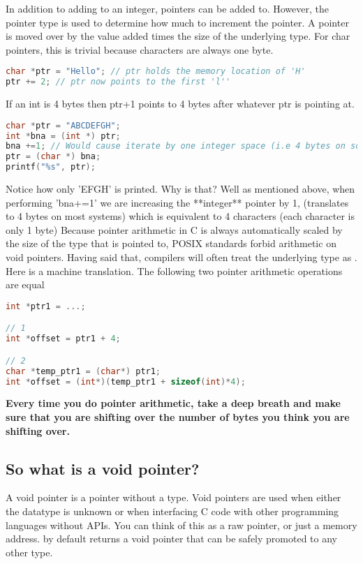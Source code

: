 In addition to adding to an integer, pointers can be added to.
However, the pointer type is used to determine how much to increment the pointer.
A pointer is moved over by the value added times the size of the underlying type.
For char pointers, this is trivial because characters are always one byte.

\begin{lstlisting}[language=C]
char *ptr = "Hello"; // ptr holds the memory location of 'H'
ptr += 2; // ptr now points to the first 'l''
\end{lstlisting}

If an int is 4 bytes then ptr+1 points to 4 bytes after whatever ptr is pointing at.

\begin{lstlisting}[language=C]
char *ptr = "ABCDEFGH";
int *bna = (int *) ptr;
bna +=1; // Would cause iterate by one integer space (i.e 4 bytes on some systems)
ptr = (char *) bna;
printf("%s", ptr);
\end{lstlisting}

Notice how only 'EFGH' is printed.
Why is that? Well as mentioned above, when performing 'bna+=1' we are increasing the **integer** pointer by 1, (translates to 4 bytes on most systems) which is equivalent to 4 characters (each character is only 1 byte)
Because pointer arithmetic in C is always automatically scaled by the size of the type that is pointed to, POSIX standards forbid arithmetic on void pointers.
Having said that, compilers will often treat the underlying type as .
Here is a machine translation.
The following two pointer arithmetic operations are equal

\begin{lstlisting}[language=C]
int *ptr1 = ...;

// 1
int *offset = ptr1 + 4;

// 2
char *temp_ptr1 = (char*) ptr1;
int *offset = (int*)(temp_ptr1 + sizeof(int)*4);
\end{lstlisting}

\textbf{Every time you do pointer arithmetic, take a deep breath and make sure that you are shifting over the number of bytes you think you are shifting over.}

\subsection{So what is a void pointer?}

A void pointer is a pointer without a type.
Void pointers are used when either the datatype is unknown or when interfacing C code with other programming languages without APIs.
You can think of this as a raw pointer, or just a memory address.
 by default returns a void pointer that can be safely promoted to any other type.

